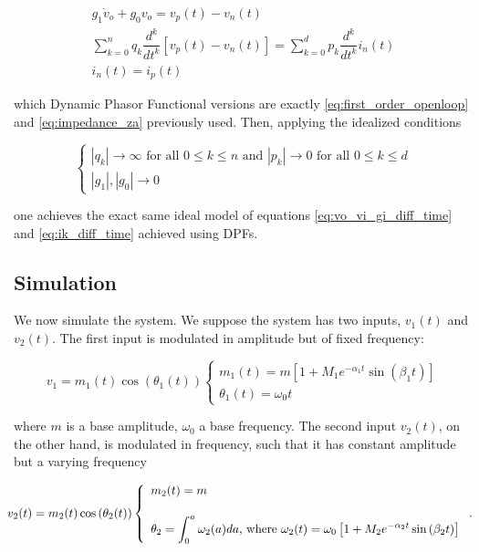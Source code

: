 \begin{gather}
	g_1 \dot{v}_o + g_0 v_o = v_p(t) - v_n(t) \\[5mm]
	\sum_{k=0}^n q_k\dfrac{d^k}{dt^k}\left[v_p(t) - v_n(t)\right] = \sum_{k=0}^d p_k\dfrac{d^k}{dt^k} i_n(t) \\[5mm]
	i_n(t) = i_p(t)
\end{gather}

	\noindent which Dynamic Phasor Functional versions are exactly \eqref{eq:first_order_openloop} and \eqref{eq:impedance_za} previously used. Then, applying the idealized conditions

\begin{equation} \left\{\begin{array}{l} \left\lvert q_k\right\rvert \to \infty \text{ for all } 0 \leq k \leq n \text{ and } \left\lvert p_k\right\rvert \to 0 \text{ for all } 0 \leq k \leq d \\[5mm] \left\lvert g_1\right\rvert,\left\lvert g_0\right\rvert \to 0\end{array}\right.\end{equation}

	\noindent one achieves the exact same ideal model of equations \eqref{eq:vo_vi_gi_diff_time} and \eqref{eq:ik_diff_time} achieved using DPFs.

\subsection{Simulation} %

	We now simulate the system. We suppose the system has two inputs, $v_1(t)$ and $v_2(t)$. The first input is modulated in amplitude but of fixed frequency:

\begin{equation} v_1 = m_1(t)\cos\left(\theta_1(t)\right) \left\{\begin{array}{l} m_1(t) = m\left[1 + M_1e^{-\alpha_1 t}\sin\left(\beta_1 t\right)\right]  \\ \theta_1(t) = \omega_0 t \end{array}\right.\end{equation}

	\noindent where $m$ is a base amplitude, $\omega_0$ a base frequency. The second input $v_2(t)$, on the other hand, is modulated in frequency, such that it has constant amplitude but a varying frequency

\begin{equation}\hspace{-2mm} v_2(t) = m_2(t)\cos\left(\theta_2(t)\right)\left\{\begin{array}{l} m_2(t) = m \\[5mm] \theta_2 = \displaystyle\int_0^a \omega_2(a)da \text{, where } \omega_2(t) = \omega_0\left[1 + M_2e^{-\alpha_2 t}\sin\left(\beta_2 t\right)\right]\end{array}\right. . \end{equation}

